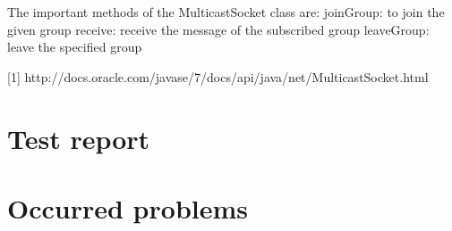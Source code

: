 \documentclass[11pt, a4paper]{article}
\begin{document}
The important methods of the MulticastSocket class are:
joinGroup: to join the given group
receive: receive the message of the subscribed group
leaveGroup: leave the specified group



[1] http://docs.oracle.com/javase/7/docs/api/java/net/MulticastSocket.html


\section{Test report}
\section{Occurred problems}
{}

\end{document}

